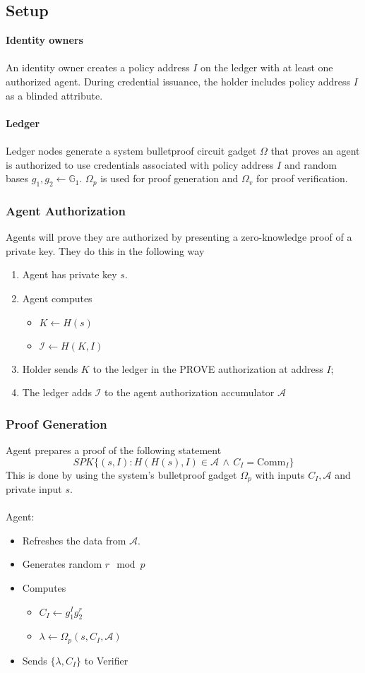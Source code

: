 \documentclass[a4paper]{article}
\begin{document}
\subsection{Setup}
\textbf{Identity owners}\\\\
An identity owner creates a policy address $I$ on the ledger with at least one authorized agent. During credential issuance, the holder includes policy address $I$ as a blinded attribute.\\\\
\textbf{Ledger}\\\\
Ledger nodes generate a system bulletproof circuit gadget $\Omega$ that proves an agent is authorized to use credentials associated with policy address $I$ and random bases $g_1,g_2 \leftarrow \mathbb{G}_1$. $\Omega_p$ is used for proof generation and $\Omega_v$ for proof verification.
\subsubsection{Agent Authorization}
Agents will prove they are authorized by presenting a zero-knowledge proof of a private key. They do this in the following way
\begin{enumerate}
    \item Agent has private key $s$.
    \item Agent computes
    \begin{itemize}
        \item $K \leftarrow H(s)$
        \item $\mathcal{I} \leftarrow H(K, I)$
    \end{itemize}
    \item Holder sends $K$ to the ledger in the PROVE authorization at address $I$;
    \item The ledger adds $\mathcal{I}$ to the agent authorization accumulator $\mathcal{A}$
\end{enumerate}

\subsubsection{Proof Generation}
Agent prepares a proof of the following statement
$$
SPK\{(s,I): H(H(s),I)\in \mathcal{A}\,\wedge\,C_I = \mathrm{Comm}_I\}
$$
This is done by using the system's bulletproof gadget $\Omega_p$ with inputs $C_I,\mathcal{A}$ and private input $s$.\\\\
Agent:
\begin{itemize}
    \item Refreshes the data from $\mathcal{A}$.
    \item Generates random $r \mod p$
    \item Computes
    \begin{itemize}
        \item $C_I \leftarrow g_1^Ig_2^r$
        \item $\lambda \leftarrow \Omega_p(s, C_I, \mathcal{A})$
    \end{itemize}
    \item Sends $\{\lambda, C_I\}$ to Verifier
\end{itemize}
\end{document}
